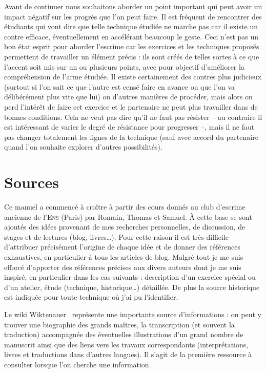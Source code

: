 Avant de continuer nous souhaitons aborder un point important qui peut avoir un impact négatif sur les progrès que l'on peut faire.
Il est fréquent de rencontrer des étudiants qui vont dire que telle technique étudiée ne marche pas car il existe un contre efficace, éventuellement en accélérant beaucoup le geste.
Ceci n'est pas un bon état esprit pour aborder l'escrime car les exercices et les techniques proposés permettent de travailler un élément précis : ils sont créés de telles sortes à ce que l'accent soit mis sur un ou plusieurs points, avec pour objectif d'améliorer la compréhension de l'arme étudiée.
Il existe certainement des contres plus judicieux (surtout si l'on sait ce que l'autre est censé faire en avance ou que l'on va délibérément plus vite que lui) ou d'autres manières de procéder, mais alors on perd l'intérêt de faire cet exercice et le partenaire ne peut plus travailler dans de bonnes conditions.
Cela ne veut pas dire qu'il ne faut pas résister – au contraire il est intéressant de varier le degré de résistance pour progresser –, mais il ne faut pas changer totalement les lignes de la technique (sauf avec accord du partenaire quand l'on souhaite explorer d'autres possibilités).


\section{Sources}


Ce manuel a commencé à croître à partir des cours donnés au club d'escrime ancienne de l'\textsc{Ens} (Paris) par Romain, Thomas et Samuel.
À cette base se sont ajoutés des idées provenant de mes recherches personnelles, de discussion, de stages et de lectures (blog, livres…).
Pour cette raison il est très difficile d'attribuer précisément l'origine de chaque idée et de donner des références exhaustives, en particulier à tous les articles de blog.
Malgré tout je me suis efforcé d'apporter des références précises aux divers auteurs dont je me suis inspiré, en particulier dans les cas suivants : description d'un exercice spécial ou d'un atelier, étude (technique, historique…) détaillée.
De plus la source historique est indiquée pour toute technique où j'ai pu l'identifier.

Le wiki Wiktenauer~\cite{wiktenauer} représente une importante source d'informations : on peut y trouver une biographie des grands maîtres, la transcription (et souvent la traduction) accompagnée des éventuelles illustrations d'un grand nombre de manuscrit ainsi que des liens vers les travaux correspondants (interprétations, livres et traductions dans d'autres langues).
Il s'agit de la première ressource à consulter lorsque l'on cherche une information.

